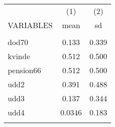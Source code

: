\documentclass[]{article}
\begin{document}
\begin{tabular}{lcc} \hline
 & (1) & (2) \\
VARIABLES & mean & sd \\ \hline
 &  &  \\
dod70 & 0.133 & 0.339 \\
kvinde & 0.512 & 0.500 \\
pension66 & 0.512 & 0.500 \\
udd2 & 0.391 & 0.488 \\
udd3 & 0.137 & 0.344 \\
udd4 & 0.0346 & 0.183 \\
 &  &  \\ \hline
\end{tabular}
\end{document}
